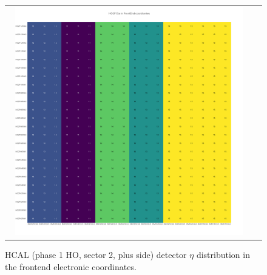 \begin{figure}[htb]
 \begin{center}
  \begin{tabular}{cc}
   \includegraphics[angle=0,width=0.95\textwidth]{figures/appendix/HO2P_Eta_in_FrontEnd.png}
  \end{tabular}
  \caption{HCAL (phase 1 HO, sector 2, plus side) detector $\eta$ distribution in the frontend electronic coordinates.}
  \label{fig:lmapHO2PEtaFEC}
 \end{center}
\end{figure}
\clearpage

